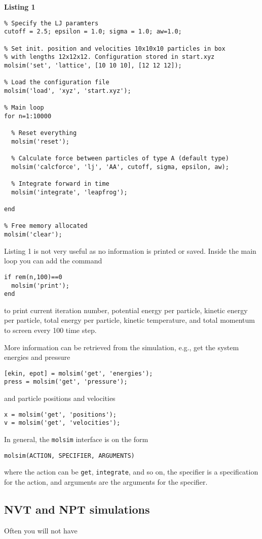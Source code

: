 \documentclass[11pt]{article}
\begin{document}
\bigskip

\noindent \textbf{Listing 1}
\begin{verbatim}
% Specify the LJ paramters
cutoff = 2.5; epsilon = 1.0; sigma = 1.0; aw=1.0;

% Set init. position and velocities 10x10x10 particles in box
% with lengths 12x12x12. Configuration stored in start.xyz
molsim('set', 'lattice', [10 10 10], [12 12 12]);

% Load the configuration file
molsim('load', 'xyz', 'start.xyz');

% Main loop
for n=1:10000

  % Reset everything
  molsim('reset');

  % Calculate force between particles of type A (default type)
  molsim('calcforce', 'lj', 'AA', cutoff, sigma, epsilon, aw);

  % Integrate forward in time
  molsim('integrate', 'leapfrog');
 
end

% Free memory allocated
molsim('clear');
\end{verbatim}
Listing 1 is not very useful as no information is printed or saved. Inside the
main loop you can add the command
\begin{verbatim}
if rem(n,100)==0
  molsim('print');
end
\end{verbatim}
to print current iteration number, potential energy per particle, kinetic energy
per particle, total energy per particle, kinetic temperature, and total momentum
to screen every 100 time step.

More information can be retrieved from the simulation, e.g., get the system
energies and pressure 
\begin{verbatim}
[ekin, epot] = molsim('get', 'energies');
press = molsim('get', 'pressure');
\end{verbatim}
and particle positions and velocities
\begin{verbatim}
x = molsim('get', 'positions');
v = molsim('get', 'velocities');
\end{verbatim}
In general, the \verb!molsim! interface is on the form
\begin{verbatim}
molsim(ACTION, SPECIFIER, ARGUMENTS)
\end{verbatim}
where the action can be \verb!get!, \verb!integrate!, and so on, the specifier
is a specification for the action, and arguments are the arguments for the
specifier. 

\subsection{NVT and NPT simulations}
Often you will not have
\end{document}

